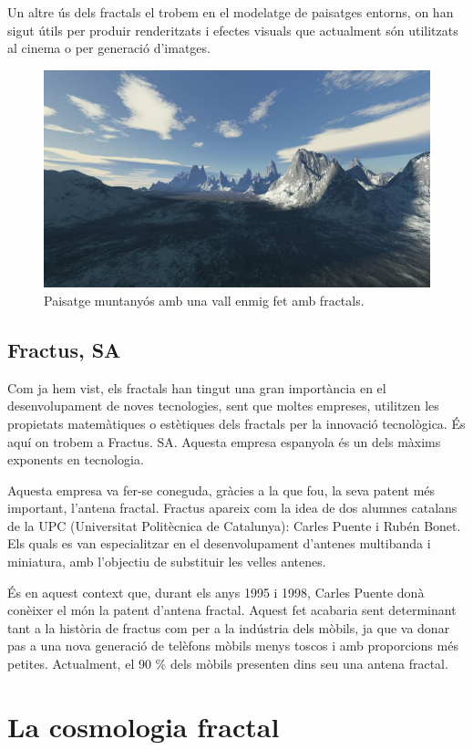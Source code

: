 \documentclass[12pt,a4paper]{report}
\begin{document}
Un altre ús dels fractals el trobem en el modelatge de paisatges entorns, on han sigut útils per produir renderitzats i efectes visuals que actualment són utilitzats al cinema o per generació d'imatges. 
\begin{figure}[!ht]
\centering
\includegraphics[scale=0.4]{img/img05_02_image_fractal.jpg}
\caption{\textbf{} Paisatge muntanyós amb una vall enmig fet amb fractals.}
\end{figure}
\subsection{Fractus, SA}
Com ja hem vist, els fractals han tingut una gran importància en el desenvolupament de noves tecnologies, sent que moltes empreses, utilitzen les propietats matemàtiques o estètiques dels fractals per la innovació tecnològica. És aquí on trobem a Fractus. SA. Aquesta empresa espanyola és un dels màxims exponents en tecnologia.

Aquesta empresa va fer-se coneguda, gràcies a la que fou, la seva patent més important, l'antena fractal. Fractus apareix com la idea de dos alumnes catalans de la UPC (Universitat Politècnica de Catalunya): Carles Puente i Rubén Bonet. Els quals es van especialitzar en el desenvolupament d'antenes multibanda i miniatura, amb l'objectiu de substituir les velles antenes. 
 
És en aquest context que, durant els anys 1995 i 1998, Carles Puente donà conèixer el món la patent d'antena fractal. Aquest fet acabaria sent determinant tant a la història de fractus com per a la indústria dels mòbils, ja que va donar pas a una nova generació de telèfons mòbils menys toscos i amb proporcions més petites. Actualment, el 90 \% dels mòbils presenten dins seu una antena fractal.

\section{La cosmologia fractal}
\end{document}

